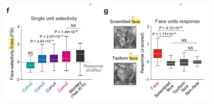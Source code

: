 \documentclass[final,3p,times,twocolumn]{elsarticle}
\begin{document}
\begin{figure}[htbp]
	\subfigure%
	{
		\begin{minipage}[t]{1.0\linewidth}
			\centering
			\includegraphics[width=1.0\textwidth]{figs/fig_1_f_g.pdf}
		\end{minipage}
	}
	

\end{figure}
\end{document}
